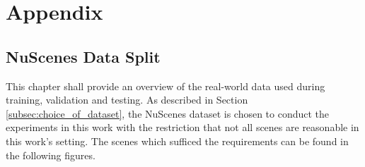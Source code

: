 
\chapter{Appendix}
\section{NuScenes Data Split}
\label{apx:trainvaltestsplit}
This chapter shall provide an overview of the real-world data used during training, validation and testing. As described in Section \ref{subsec:choice_of_dataset}, the NuScenes dataset is chosen to conduct the experiments in this work with the restriction that not all scenes are reasonable in this work's setting. The scenes which sufficed the requirements can be found in the following figures.

